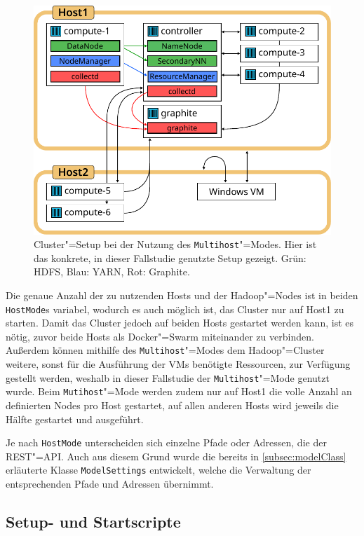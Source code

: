 \begin{figure}[h]
    \includegraphics{./resources/caseStudyHadoopSetup.pdf}
    \caption[Cluster"=Setup bei der Nutzung des Multihost"=Modes]
    {Cluster"=Setup bei der Nutzung des \texttt{Multihost}"=Modes.
    Hier ist das konkrete, in dieser Fallstudie genutzte Setup gezeigt.
    Grün: \gls{HDFS}, Blau: \gls{YARN}, Rot: Graphite.}
    \label{fig:caseStudyHadoopSetup}
\end{figure}

Die genaue Anzahl der zu nutzenden Hosts und der Hadoop"=Nodes ist in beiden \texttt{HostMode}s variabel, wodurch es auch möglich ist, das Cluster nur auf Host1 zu starten.
Damit das Cluster jedoch auf beiden Hosts gestartet werden kann, ist es nötig, zuvor beide Hosts als Docker"=Swarm miteinander zu verbinden.
Außerdem können mithilfe des \texttt{Multihost}"=Modes dem Hadoop"=Cluster weitere, sonst für die Ausführung der VMs benötigte Ressourcen, zur Verfügung gestellt werden, weshalb in dieser Fallstudie der \texttt{Multihost}"=Mode genutzt wurde.
Beim \texttt{Mutihost}"=Mode werden zudem nur auf Host1 die volle Anzahl an definierten Nodes pro Host gestartet, auf allen anderen Hosts wird jeweils die Hälfte gestartet und ausgeführt.

Je nach \texttt{HostMode} unterscheiden sich einzelne Pfade oder Adressen, \zB die der \gls{REST}"=API.
Auch aus diesem Grund wurde die bereits in \cref{subsec:modelClass} erläuterte Klasse \texttt{ModelSettings} entwickelt, welche die Verwaltung der entsprechenden Pfade und Adressen übernimmt.

\subsection{Setup- und Startscripte}
\label{subsec:scripts}

